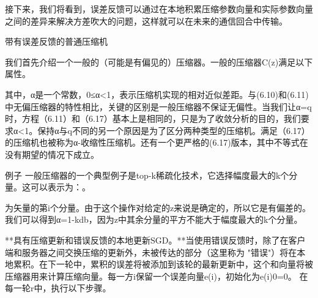 接下来，我们将看到，误差反馈可以通过在本地积累压缩参数向量和实际参数向量之间的差异来解决方差吹大的问题，这样就可以在未来的通信回合中传输。

 带有误差反馈的普通压缩机

我们首先介绍一个一般的（可能是有偏见的）压缩器。一般的压缩器C(z)满足以下属性。

其中，α是一个常数，0≤α<1，表示压缩机实现的相对近似差距。与(6.10)和(6.11)中无偏压缩器的特性相比，关键的区别是一般压缩器不保证无偏性。当我们让α=q时，方程（6.11）和（6.17）基本上是相同的，只是为了收敛分析的目的，我们要求α<1。保持α与q不同的另一个原因是为了区分两种类型的压缩机。满足（6.17）的压缩机也被称为α-收缩性压缩机。还有一个更严格的(6.17)版本，其中不等式在没有期望的情况下成立。

例子 一般压缩器的一个典型例子是top-k稀疏化技术，它选择幅度最大的k个分量。这可以表示为：。

为矢量的第i个分量。由于这个操作对给定的z来说是确定的，所以它是有偏差的。我们可以得到α=1-kdb，因为z中其余分量的平方不能大于幅度最大的k个分量。

**具有压缩更新和错误反馈的本地更新SGD。**当使用错误反馈时，除了在客户端和服务器之间交换压缩的更新外，未被传达的部分（这里称为 "错误"）将在本地累积。在下一轮中，累积的误差将被添加到该轮的最新更新中，这个和向量将被压缩器用来计算压缩向量。每一方i保留一个误差向量e(i)，初始化为e(i)0=0。 在每一轮r中，执行以下步骤。

